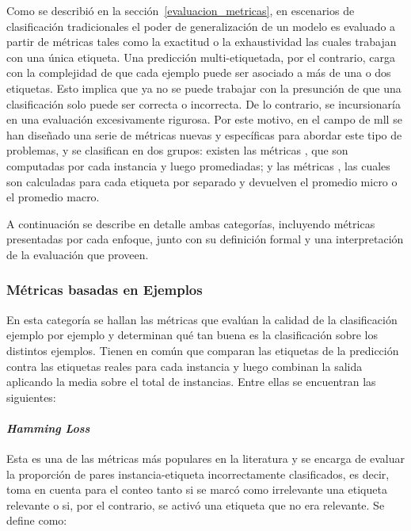 Como se describió en la sección~\ref{evaluacion_metricas}, en escenarios de
clasificación tradicionales el poder de generalización de un modelo es evaluado
a partir de métricas tales como la exactitud o la exhaustividad las cuales
trabajan con una única etiqueta. Una predicción multi-etiquetada, por el
contrario, carga con la complejidad de que cada ejemplo puede ser asociado a más
de una o dos etiquetas. Esto implica que ya no se puede trabajar con la
presunción de que una clasificación solo puede ser correcta o incorrecta. De lo
contrario, se incursionaría en una evaluación excesivamente rigurosa. Por este
motivo, en el campo de \acrshort{mll} se han diseñado una serie de métricas
nuevas y específicas para abordar este tipo de problemas, y se clasifican en dos
grupos: existen las métricas , que son computadas
por cada instancia y luego promediadas; y las métricas , las cuales son calculadas para cada etiqueta por separado y
devuelven el promedio micro o el promedio macro.

A continuación se describe en detalle ambas categorías, incluyendo métricas
presentadas por cada enfoque, junto con su definición formal y una
interpretación de la evaluación que proveen.

\subsubsection{Métricas basadas en Ejemplos}

En esta categoría se hallan las métricas que evalúan la calidad de la
clasificación ejemplo por ejemplo y determinan qué tan buena es la clasificación
sobre los distintos ejemplos. Tienen en común que comparan las etiquetas de la
predicción contra las etiquetas reales para cada instancia y luego combinan la
salida aplicando la media sobre el total de instancias. Entre ellas se
encuentran las siguientes:

\paragraph{\textit{Hamming Loss}}

Esta es una de las métricas más populares en la literatura y se encarga de
evaluar la proporción de pares instancia-etiqueta incorrectamente clasificados,
es decir, toma en cuenta para el conteo tanto si se marcó como irrelevante una
etiqueta relevante o si, por el contrario, se activó una etiqueta que no era
relevante. Se define como:

